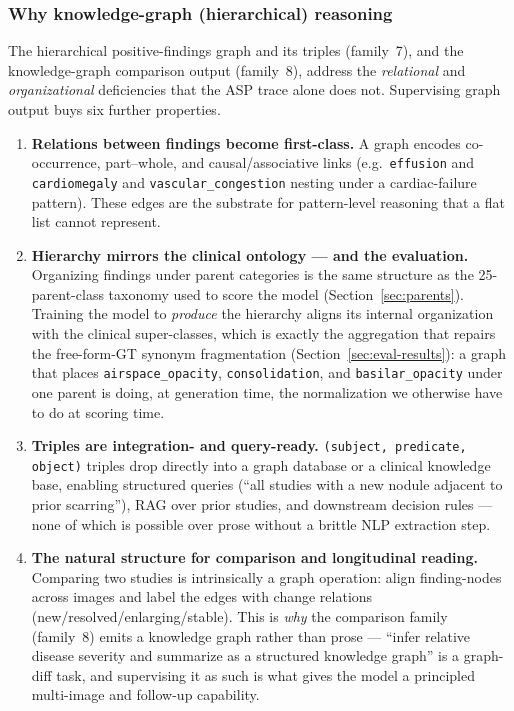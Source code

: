 \documentclass[11pt,a4paper]{article}
\begin{document}
\subsubsection{Why knowledge-graph (hierarchical) reasoning}
The hierarchical positive-findings graph and its triples (family~7), and the knowledge-graph comparison output (family~8), address the \emph{relational} and \emph{organizational} deficiencies that the ASP trace alone does not. Supervising graph output buys six further properties.
\begin{enumerate}[leftmargin=1.6em]
  \item \textbf{Relations between findings become first-class.} A graph encodes co-occurrence, part--whole, and causal/associative links (e.g.\ \texttt{effusion} and \texttt{cardiomegaly} and \texttt{vascular\_congestion} nesting under a cardiac-failure pattern). These edges are the substrate for pattern-level reasoning that a flat list cannot represent.
  \item \textbf{Hierarchy mirrors the clinical ontology --- and the evaluation.} Organizing findings under parent categories is the same structure as the 25-parent-class taxonomy used to score the model (Section~\ref{sec:parents}). Training the model to \emph{produce} the hierarchy aligns its internal organization with the clinical super-classes, which is exactly the aggregation that repairs the free-form-GT synonym fragmentation (Section~\ref{sec:eval-results}): a graph that places \texttt{airspace\_opacity}, \texttt{consolidation}, and \texttt{basilar\_opacity} under one parent is doing, at generation time, the normalization we otherwise have to do at scoring time.
  \item \textbf{Triples are integration- and query-ready.} \texttt{(subject, predicate, object)} triples drop directly into a graph database or a clinical knowledge base, enabling structured queries (``all studies with a new nodule adjacent to prior scarring''), RAG over prior studies, and downstream decision rules --- none of which is possible over prose without a brittle NLP extraction step.
  \item \textbf{The natural structure for comparison and longitudinal reading.} Comparing two studies is intrinsically a graph operation: align finding-nodes across images and label the edges with change relations (new/resolved/enlarging/stable). This is \emph{why} the comparison family (family~8) emits a knowledge graph rather than prose --- ``infer relative disease severity and summarize as a structured knowledge graph'' is a graph-diff task, and supervising it as such is what gives the model a principled multi-image and follow-up capability.

\end{enumerate}
\end{document}

